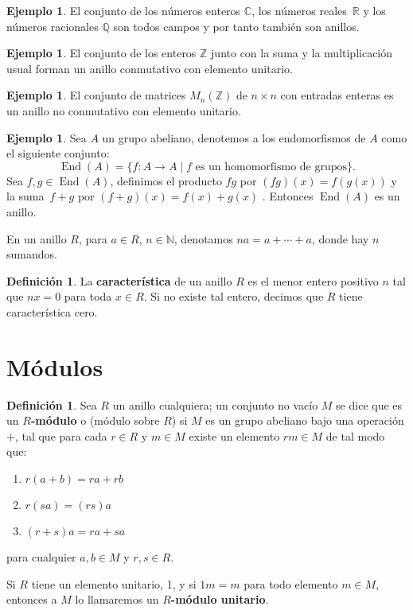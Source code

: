 \documentclass[12pt]{book}
\theoremstyle{definition}
\newtheorem{definition}[theorem]{Definición}
\newtheorem{example}[theorem]{Ejemplo}
\DeclareMathOperator{\End}{End}
\newcounter{in}
\newcounter{ini}
\begin{document}
\begin{example}
  El conjunto de los números enteros $\mathbb{C}$, los números reales~$\mathbb{R}$ y los números racionales $\mathbb{Q}$ son todos campos
  y por tanto también son anillos.
\end{example}

\begin{example}
  El conjunto de los enteros $\mathbb{Z}$ junto con la suma y la
  multiplicación usual forman un anillo conmutativo con elemento unitario.
\end{example}

\begin{example}
  El conjunto de matrices $M_{n}(\mathbb{Z})$ de $n\times n$ con
  entradas enteras es un anillo no conmutativo con elemento unitario.
\end{example}

\begin{example}
  Sea $A$ un grupo abeliano, denotemos a los endomorfismos de $A$ como
  el siguiente conjunto: 
  \begin{equation*}
    \End(A)=\{f:A\rightarrow A\mid f\mbox{ es un homomorfismo de grupos}\}.
    \label{endomorfismos}
  \end{equation*}
  Sea $f,g\in\End(A)$, definimos el producto $fg$ por $(fg)(x)=f(g(x))$ y
  la suma~$f+g$ por $(f+g)(x)=f(x)+g(x)$ . Entonces $\End(A)$ es un anillo.
\end{example}

En un anillo $R$, para $a\in R$, $n\in\mathbb{N}$, denotamos $na=a+\cdots+a$, donde hay $n$ sumandos.
\begin{definition}
  La \textbf{característica} de un anillo $R$ es el menor entero positivo $n$
  tal que $nx=0$ para toda $x\in R$. Si no existe tal entero, decimos
  que $R$ tiene característica cero.
\end{definition}

\section{Módulos}
\label{modulos}

\begin{definition}
  Sea $R$ un anillo cualquiera; un conjunto no vacío $M$ se dice que
  es un \textbf{$R$-módulo} o (módulo sobre $R$) si $M$ es un grupo abeliano
  bajo una operación $+$, tal que para cada $r\in R$ y $m\in M$ existe
  un elemento $rm\in M$ de tal modo que:
  \begin{enumerate}
  \item $r(a+b)=ra+rb$
  \item $r(sa)=(rs)a$
  \item $(r+s)a=ra+sa$
  \end{enumerate}
  para cualquier $a,b \in M$ y $r,s\in R$.

  Si $R$ tiene un elemento unitario, 1, y si $1m=m$ para todo elemento
  $m\in M$, entonces a $M$ lo llamaremos un \textbf{$R$-módulo
  unitario}.
\end{definition}
\end{document}
